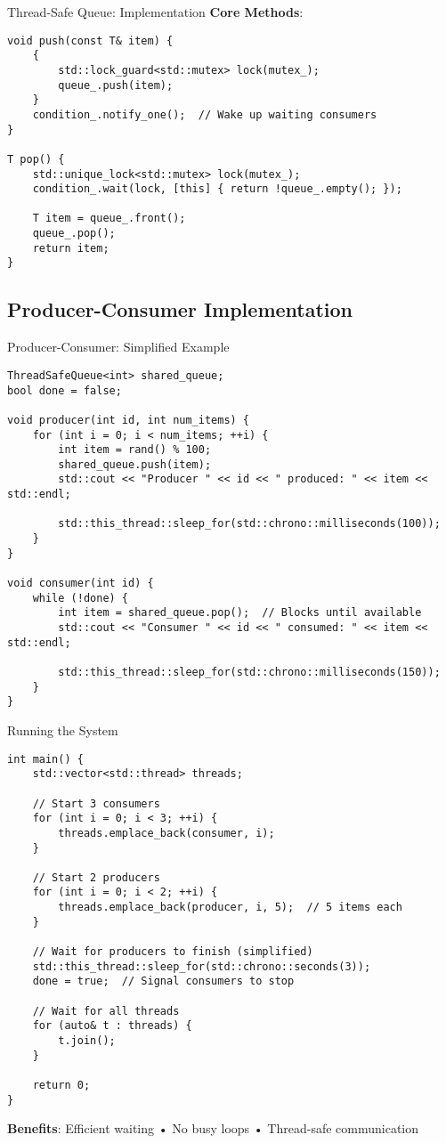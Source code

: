 \begin{frame}[fragile]{ Thread-Safe Queue: Implementation}
	\textbf{Core Methods}:

	\begin{verbatim}
void push(const T& item) {
    {
        std::lock_guard<std::mutex> lock(mutex_);
        queue_.push(item);
    }
    condition_.notify_one();  // Wake up waiting consumers
}

T pop() {
    std::unique_lock<std::mutex> lock(mutex_);
    condition_.wait(lock, [this] { return !queue_.empty(); });

    T item = queue_.front();
    queue_.pop();
    return item;
}
	\end{verbatim}
\end{frame}

\subsection{Producer-Consumer Implementation}
\begin{frame}[fragile]{ Producer-Consumer: Simplified Example}
	\begin{verbatim}
ThreadSafeQueue<int> shared_queue;
bool done = false;

void producer(int id, int num_items) {
    for (int i = 0; i < num_items; ++i) {
        int item = rand() % 100;
        shared_queue.push(item);
        std::cout << "Producer " << id << " produced: " << item << std::endl;

        std::this_thread::sleep_for(std::chrono::milliseconds(100));
    }
}

void consumer(int id) {
    while (!done) {
        int item = shared_queue.pop();  // Blocks until available
        std::cout << "Consumer " << id << " consumed: " << item << std::endl;

        std::this_thread::sleep_for(std::chrono::milliseconds(150));
    }
}
	\end{verbatim}
\end{frame}

\begin{frame}[fragile]{ Running the System}
	\begin{verbatim}
int main() {
    std::vector<std::thread> threads;

    // Start 3 consumers
    for (int i = 0; i < 3; ++i) {
        threads.emplace_back(consumer, i);
    }

    // Start 2 producers
    for (int i = 0; i < 2; ++i) {
        threads.emplace_back(producer, i, 5);  // 5 items each
    }

    // Wait for producers to finish (simplified)
    std::this_thread::sleep_for(std::chrono::seconds(3));
    done = true;  // Signal consumers to stop

    // Wait for all threads
    for (auto& t : threads) {
        t.join();
    }

    return 0;
}
	\end{verbatim}

	\textbf{Benefits}: Efficient waiting • No busy loops • Thread-safe communication
\end{frame}

